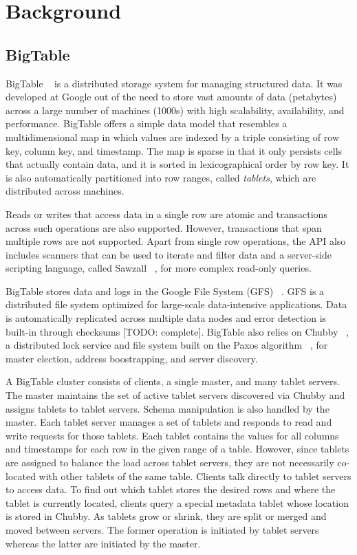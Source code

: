 \documentclass[10pt,final,journal]{IEEEtran}
\begin{document}


\section{Background}

\subsection{BigTable}
BigTable ~\cite{Chang:2006:BDS:1267308.1267323} is a distributed storage system for managing structured data. It was developed at Google out of the need to store vast amounts of data (petabytes) across a large number of machines (1000s) with high scalability, availability, and performance. BigTable offers a simple data model that resembles a multidimensional map in which values are indexed by a triple consisting of row key, column key, and timestamp. The map is sparse in that it only persists cells that actually contain data, and it is sorted in lexicographical order by row key. It is also automatically partitioned into row ranges, called \emph{tablets}, which are distributed across machines.

Reads or writes that access data in a single row are atomic and transactions across such operations are also supported. However, transactions that span multiple rows are not supported. Apart from single row operations, the API also includes scanners that can be used to iterate and filter data and a server-side scripting language, called Sawzall ~\cite{Pike:2005}, for more complex read-only queries.

BigTable stores data and logs in the Google File System (GFS) ~\cite{Ghemawat:2003:GFS:1165389.945450}. GFS is a distributed file system optimized for large-scale data-intensive applications. Data is automatically replicated across multiple data nodes and error detection is built-in through checksums [TODO: complete]. BigTable also relies on Chubby ~\cite{Burrows:2006}, a distributed lock service and file system built on the Paxos algorithm ~\cite{Lamport:1998:PP:279227.279229, Lamport:2001:PMS}, for master election, address boostrapping, and server discovery.

A BigTable cluster consists of clients, a single master, and many tablet servers. The master maintains the set of active tablet servers discovered via Chubby and assigns tablets to tablet servers. Schema manipulation is also handled by the master. Each tablet server manages a set of tablets and responds to read and write requests for those tablets. Each tablet contains the values for all columns and timestamps for each row in the given range of a table. However, since tablets are assigned to balance the load across tablet servers, they are not necessarily co-located with other tablets of the same table. Clients talk directly to tablet servers to access data. To find out which tablet stores the desired rows and where the tablet is currently located, clients query a special metadata tablet whose location is stored in Chubby. As tablets grow or shrink, they are split or merged and moved between servers. The former operation is initiated by tablet servers whereas the latter are initiated by the master.
\end{document}
